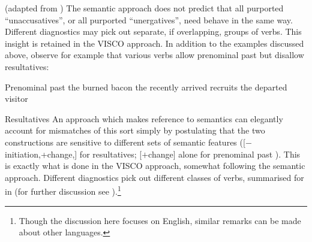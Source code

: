 \documentclass[output=paper]{langsci/langscibook}
\begin{document}
\ea\label{ex:19.36}  (adapted from \citealt[131]{Zaenen1993})
    \z
\z
The semantic approach does not predict that all purported
\enquote{unaccusatives}, or all purported \enquote{unergatives}, need behave in
the same way. Different diagnostics may pick out separate, if overlapping,
groups of verbs. This insight is retained in the VISCO approach. In addition to
the examples discussed above, observe for example that various verbs allow
prenominal past  but disallow resultatives:

\ea Prenominal past 
    \ea the burned bacon
    \ex the recently arrived recruits
    \ex the departed visitor
    \z
\z

\ea Resultatives
    \z
\z\largerpage[1]
An approach which makes reference to semantics can elegantly account for
mismatches of this sort simply by postulating that the two constructions are
sensitive to different sets of semantic features ([$-$initiation,+change,] for
resultatives; [$+$change] alone for prenominal past ). This is
exactly what is done in the VISCO approach, somewhat following the semantic
approach. Different diagnostics pick out different classes of verbs, summarised
for  in  (for further discussion see
\citealt{Baker2018,Baker2019}).\footnote{Though the discussion here focuses on
English, similar remarks can be made about other languages.}
\end{document}
